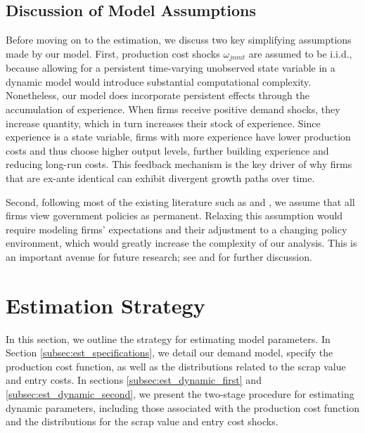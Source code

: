 \documentclass[12pt, letter]{article}
\begin{document}
\subsection{Discussion of Model Assumptions}

Before moving on to the estimation, we discuss two key simplifying assumptions made by our model. 
First, production cost shocks $\omega_{jnmt}$ are assumed to be i.i.d., because allowing for a persistent time-varying unobserved state variable in a dynamic model would introduce substantial computational complexity. Nonetheless, our model does incorporate persistent effects through the accumulation of experience. When firms receive positive demand shocks, they increase quantity, which in turn increases their stock of experience.  Since experience is a state variable, firms with more experience have lower production costs and thus choose higher output levels, further building experience and reducing long-run costs. This feedback mechanism is the key driver of why firms that are ex-ante identical can exhibit divergent growth paths over time.

Second, following most of the existing literature such as \citet{ryan2012costs} and \citet{barwick2025industrial}, we assume that all firms view government policies as permanent.  Relaxing this assumption would require modeling firms’ expectations and their adjustment to a changing policy environment, which would greatly increase the complexity of our analysis. This is an important avenue for future research; see \citet{gowrisankaran2025policy} and \citet{chen2024dynamic} for further discussion.


\section{Estimation Strategy}
In this section, we outline the strategy for estimating model parameters. In Section \ref{subsec:est_specifications}, we detail our demand model, specify the production cost function, as well as the distributions related to the scrap value and entry costs. In sections \ref{subsec:est_dynamic_first} and \ref{subsec:est_dynamic_second}, we present the two-stage procedure for estimating dynamic parameters, including those associated with the production cost function and the distributions for the scrap value and entry cost shocks.
\end{document}

